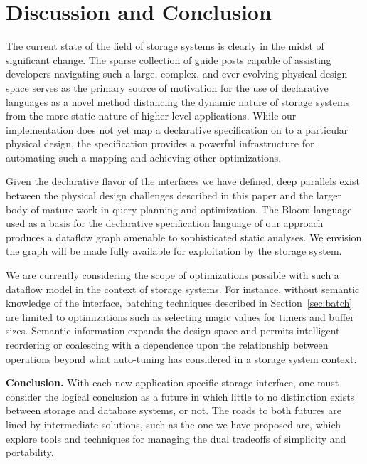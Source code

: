 \section{Discussion and Conclusion}
\label{sec:opts}

The current state of the field of storage systems is clearly in the midst of significant
change. The sparse collection of guide posts capable of assisting developers navigating such a
large, complex, and ever-evolving physical design space serves as the primary source of 
motivation for the use of declarative languages as a novel method distancing 
the dynamic nature of storage systems from the more static nature of higher-level
applications. While our implementation does not yet map a declarative specification 
on to a particular physical design, the specification provides a powerful infrastructure for
automating such a mapping and achieving other optimizations.

Given the declarative flavor of the interfaces we have defined, 
deep parallels exist between the physical design challenges described in this paper and
the larger body of mature work in query planning and optimization. The Bloom
language used as a basis for the declarative specification language of our approach
produces a dataflow graph amenable to sophisticated static analyses. We
envision the graph will be made fully available for exploitation by the storage system.

We are currently considering the scope of optimizations possible with
such a dataflow model in the context of storage systems. For instance, without
semantic knowledge of the interface, batching techniques described in
Section~\ref{sec:batch} are limited to optimizations such as selecting magic
values for timers and buffer sizes. Semantic information expands the design
space and permits intelligent reordering or coalescing with a dependence upon the
relationship between operations beyond what auto-tuning has considered in a storage system context.

{\bf Conclusion.} With each new application-specific storage interface, one
must consider the logical conclusion as a future in which little to no
distinction exists between storage and database systems, or not. The roads to both futures
are lined by intermediate solutions, such as the one we have proposed are, which 
explore tools and techniques for managing the dual tradeoffs of simplicity and portability.

